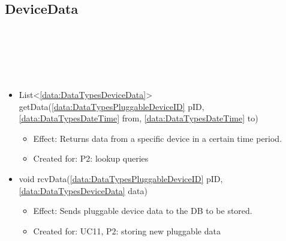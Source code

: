   \subsection{DeviceData}\label{int:PluggableDeviceDatabasePluggableDeviceDataDBDeviceData}
    \begin{description}
      \item[Provided by:] \iconcomponent{}~
      \item[Required by:] \iconcomponent{}~
      \item[Operations:] ~
    \begin{itemize}[noitemsep,nolistsep,leftmargin=-.25cm]
      \item \textsf{List\textless{}\ref{data:DataTypesDeviceData}\textgreater{} getData(\ref{data:DataTypesPluggableDeviceID} pID, \ref{data:DataTypesDateTime} from, \ref{data:DataTypesDateTime} to)}
        \begin{itemize}[noitemsep,nolistsep]
           \item Effect: Returns data from a specific device in a certain time period.
\item Created for: P2: lookup queries
        \end{itemize}
      \item \textsf{void rcvData(\ref{data:DataTypesPluggableDeviceID} pID, \ref{data:DataTypesDeviceData} data)}
        \begin{itemize}[noitemsep,nolistsep]
           \item Effect: Sends pluggable device data to the DB to be stored.
\item Created for: UC11, P2: storing new pluggable data
        \end{itemize}
    \end{itemize}
    \end{description}

